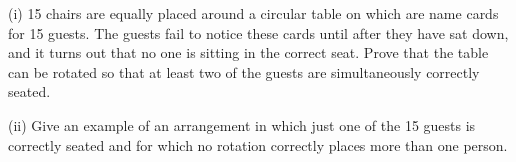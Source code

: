 (i) 15 chairs are equally placed around a circular table on which are name cards for 15 guests. The guests fail to notice these cards until after they have sat down, and it turns out that no one is sitting in the correct seat. Prove that the table can be rotated so that at least two of the guests are simultaneously correctly seated.

(ii) Give an example of an arrangement in which just one of the 15 guests is correctly seated and for which no rotation correctly places more than one person.